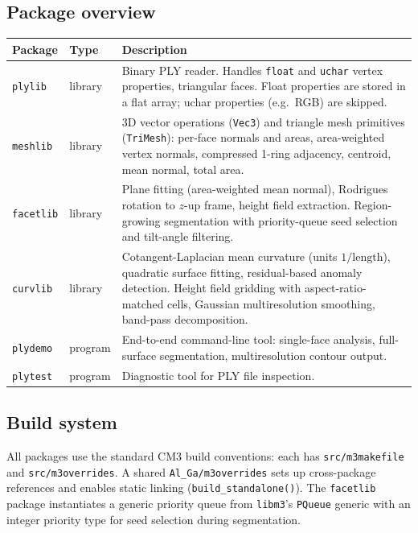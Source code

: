 \documentclass[11pt]{article}
\begin{document}
\subsection{Package overview}

\begin{center}
\begin{tabular}{llp{7cm}}
\toprule
\textbf{Package} & \textbf{Type} & \textbf{Description} \\
\midrule
\texttt{plylib} & library
  & Binary PLY reader.  Handles \texttt{float} and \texttt{uchar}
    vertex properties, triangular faces.  Float properties are
    stored in a flat array; uchar properties (e.g.\ RGB) are
    skipped. \\
\texttt{meshlib} & library
  & 3D vector operations (\texttt{Vec3}) and triangle mesh
    primitives (\texttt{TriMesh}): per-face normals and areas,
    area-weighted vertex normals, compressed 1-ring adjacency,
    centroid, mean normal, total area. \\
\texttt{facetlib} & library
  & Plane fitting (area-weighted mean normal), Rodrigues rotation
    to $z$-up frame, height field extraction.  Region-growing
    segmentation with priority-queue seed selection and tilt-angle
    filtering. \\
\texttt{curvlib} & library
  & Cotangent-Laplacian mean curvature (units $1/\text{length}$),
    quadratic surface fitting, residual-based anomaly detection.
    Height field gridding with aspect-ratio-matched cells,
    Gaussian multiresolution smoothing, band-pass decomposition. \\
\texttt{plydemo} & program
  & End-to-end command-line tool: single-face analysis,
    full-surface segmentation, multiresolution contour output. \\
\texttt{plytest} & program
  & Diagnostic tool for PLY file inspection. \\
\bottomrule
\end{tabular}
\end{center}

\subsection{Build system}

All packages use the standard CM3 build conventions: each has
\texttt{src/m3makefile} and \texttt{src/m3overrides}.  A shared
\texttt{Al\_Ga/m3overrides} sets up cross-package references and
enables static linking (\texttt{build\_standalone()}).  The
\texttt{facetlib} package instantiates a generic priority queue from
\texttt{libm3}'s \texttt{PQueue} generic with an integer priority
type for seed selection during segmentation.
\end{document}
